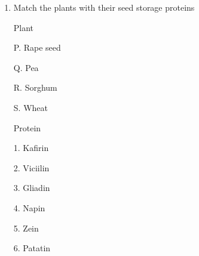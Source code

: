 \documentclass[journal]{IEEEtran}
\begin{document}
\begin{enumerate}
\begin{minipage}{0.5\textwidth}
\begin{flushleft}
Gene insert

P. bar

Q. vip3A

R. B-ley

S. gah-11

		\end{flushleft}
		\end{minipage}
	\begin{minipage}{0.5\textwidth}
		\begin{flushright}


Aspects of crop improvement

1. Tolerance to heavy metals

2. Nutritional improvement with increased vitamin A

3. Insect resistance

4. Herbicide resistance

5. Delayed ripening

6. Resistance to fungal infection

		\end{flushright}
		\end{minipage}

(A) P-4,Q-3,R-5,S-6

(B) P-4,Q-3,R-2,S-1

(C) P-2,Q-4,R-5,S-3

(D) P-4, Q-2,R-6,S-1

\item {Match the plants with their seed storage proteins}
\begin{minipage}{0.5\textwidth}
	\begin{flushleft}


Plant

P. Rape seed

Q. Pea

R. Sorghum

S. Wheat

		\end{flushleft}
		\end{minipage}
	\begin{minipage}{0.5\textwidth}
		\begin{flushright}

Protein

1. Kafirin

2. Viciilin

3. Gliadin

4. Napin

5. Zein

6. Patatin


\end{flushright}
\end{minipage}
\end{enumerate}
\end{document}

